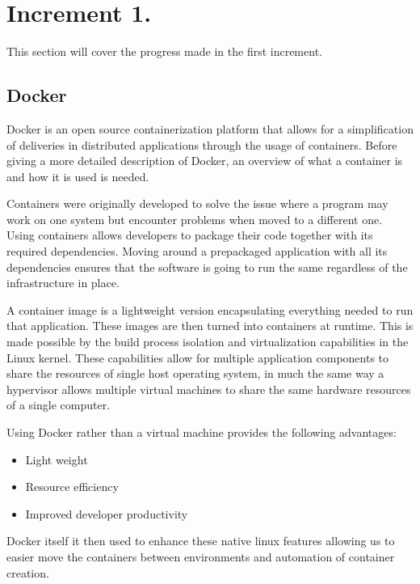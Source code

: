 \section{Increment 1.}
This section will cover the progress made in the first increment. 


\subsection{Docker}
Docker is an open source containerization platform that allows for a simplification of deliveries in distributed applications through the usage of containers. 
Before giving a more detailed description of Docker, an overview of what a container is and how it is used is needed. 


Containers were originally developed to solve the issue where a program may work on one system but encounter problems when moved to a different one. 
Using containers allows developers to package their code together with its required dependencies. 
Moving around a prepackaged application with all its dependencies ensures that the software is going to run the same regardless of the infrastructure in place. 


A container image is a lightweight version encapsulating everything needed to run that application. These images are then turned into containers at runtime. 
This is made possible by the build process isolation and virtualization capabilities in the Linux kernel. 
These capabilities allow for multiple application components to share the resources of single host operating system, 
in much the same way a hypervisor allows multiple virtual machines to share the same hardware resources of a single computer. 


Using Docker rather than a virtual machine provides the following advantages:

\begin{itemize}
    \item Light weight 
    \item Resource efficiency
    \item Improved developer productivity
\end{itemize}

Docker itself it then used to enhance these native linux features allowing us to easier move the containers between environments and automation of container creation.

